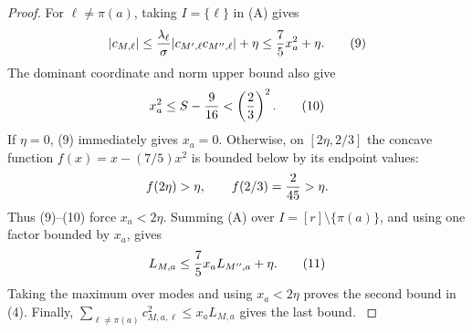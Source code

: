\begin{proposition}
\begin{proof}
For \(\ell\ne\pi(a)\), taking \(I=\{\ell\}\) in (A) gives
\[
 |c_{M,\ell}|\le {\lambda_\ell\over\sigma}
 |c_{M',\ell}c_{M'',\ell}|+\eta
 \le {7\over5}x_a^2+\eta. \tag{9}
\]
The dominant coordinate and norm upper bound also give
\[
 x_a^2\le S-{9\over16}<\left({2\over3}\right)^2. \tag{10}
\]
If \(\eta=0\), (9) immediately gives \(x_a=0\). Otherwise, on
\([2\eta,2/3]\) the concave function \(f(x)=x-(7/5)x^2\) is bounded below
by its endpoint values:
\[
 f(2\eta)>\eta,\qquad f(2/3)={2\over45}>\eta.
\]
Thus (9)--(10) force \(x_a<2\eta\). Summing (A) over
\(I=[r]\setminus\{\pi(a)\}\), and using one factor bounded by \(x_a\), gives
\[
 L_{M,a}\le {7\over5}x_a L_{M'',a}+\eta. \tag{11}
\]
Taking the maximum over modes and using \(x_a<2\eta\) proves the second
bound in (4). Finally,
\(\sum_{\ell\ne\pi(a)}c_{M,a,\ell}^2\le x_aL_{M,a}\) gives the last
bound. \(\)


\end{proof}
\end{proposition}
